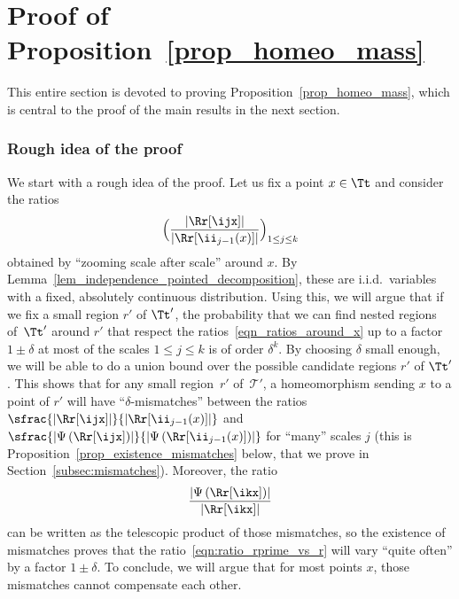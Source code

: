 \section{Proof of Proposition~\ref{prop_homeo_mass}} \label{sec:proof of prop homeo mass}
This entire section is devoted to proving Proposition~\ref{prop_homeo_mass}, which is central to the proof of the main results in the next section.

\subsubsection*{Rough idea of the proof}
We start with a rough idea of the proof.
Let us fix a point $x \in \Tt$ and consider the ratios
\begin{equation}\label{eqn_ratios_around_x}
\Bigl( \frac{\left| \Rr[\ijx] \right|}{\left| \Rr[\ii_{j-1}(x)] \right|} \Bigr)_{1 \leq j \leq k}
\end{equation}
obtained by ``zooming scale after scale'' around $x$. By Lemma~\ref{lem_independence_pointed_decomposition}, these are i.i.d.\ variables with a fixed, absolutely continuous distribution.
Using this, we will argue that if we fix a small region $r'$ of $\Tt'$, the probability that we can find nested regions of~$\Tt'$ around $r'$ that respect the ratios~\eqref{eqn_ratios_around_x} up to a factor $1\pm\delta$ at most of the scales $1 \leq j \leq k$ is of order $\delta^k$.
By choosing $\delta$ small enough, we will be able to do a union bound over the possible candidate regions $r'$ of $\Tt'$.
This shows that for any small region~$r'$ of~$\mathcal{T}'$, a homeomorphism sending $x$ to a point of $r'$ will have ``$\delta$-mismatches'' between the ratios $\sfrac{\left| \Rr[\ijx] \right|}{\left| \Rr[\ii_{j-1}(x)] \right|}$ and $\sfrac{\left| \Psi \left( \Rr[\ijx] \right) \right|}{\left| \Psi \left( \Rr[\ii_{j-1}(x)] \right) \right|}$ for ``many'' scales $j$ (this is Proposition~\ref{prop_existence_mismatches} below, that we prove in Section~\ref{subsec:mismatches}).
Moreover, the ratio
\begin{equation}\label{eqn:ratio_rprime_vs_r}
\frac{\left| \Psi \left( \Rr[\ikx] \right) \right|}{\left| \Rr[\ikx] \right|}
\end{equation}
can be written as the telescopic product of those mismatches, so the existence of mismatches proves that the ratio~\eqref{eqn:ratio_rprime_vs_r} will vary ``quite often'' by a factor $1\pm\delta$.
To conclude, we will argue that for most points $x$, those mismatches cannot compensate each other.
